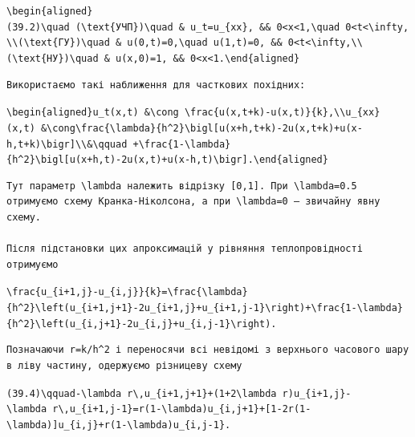 \documentclass[
  ukrainian,
]{article}
\begin{document}
\texttt{\textbackslash{}begin\{aligned\}(39.2)\textbackslash{}quad\ (\textbackslash{}text\{УЧП\})\textbackslash{}quad\ \&\ u\_t=u\_\{xx\},\ \&\&\ 0\textless{}x\textless{}1,\textbackslash{}quad\ 0\textless{}t\textless{}\textbackslash{}infty,\textbackslash{}\textbackslash{}(\textbackslash{}text\{ГУ\})\textbackslash{}quad\ \&\ u(0,t)=0,\textbackslash{}quad\ u(1,t)=0,\ \&\&\ 0\textless{}t\textless{}\textbackslash{}infty,\textbackslash{}\textbackslash{}(\textbackslash{}text\{НУ\})\textbackslash{}quad\ \&\ u(x,0)=1,\ \&\&\ 0\textless{}x\textless{}1.\textbackslash{}end\{aligned\}}

\begin{verbatim}
Використаємо такі наближення для часткових похідних:
\end{verbatim}

\texttt{\textbackslash{}begin\{aligned\}u\_t(x,t)\ \&\textbackslash{}cong\ \textbackslash{}frac\{u(x,t+k)-u(x,t)\}\{k\},\textbackslash{}\textbackslash{}u\_\{xx\}(x,t)\ \&\textbackslash{}cong\textbackslash{}frac\{\textbackslash{}lambda\}\{h\^{}2\}\textbackslash{}bigl{[}u(x+h,t+k)-2u(x,t+k)+u(x-h,t+k)\textbackslash{}bigr{]}\textbackslash{}\textbackslash{}\&\textbackslash{}qquad\ +\textbackslash{}frac\{1-\textbackslash{}lambda\}\{h\^{}2\}\textbackslash{}bigl{[}u(x+h,t)-2u(x,t)+u(x-h,t)\textbackslash{}bigr{]}.\textbackslash{}end\{aligned\}}

\begin{verbatim}
Тут параметр \lambda належить відрізку [0,1]. При \lambda=0.5 отримуємо схему Кранка-Ніколсона, а при \lambda=0 — звичайну явну схему.

Після підстановки цих апроксимацій у рівняння теплопровідності отримуємо
\end{verbatim}

\texttt{\textbackslash{}frac\{u\_\{i+1,j\}-u\_\{i,j\}\}\{k\}=\textbackslash{}frac\{\textbackslash{}lambda\}\{h\^{}2\}\textbackslash{}left(u\_\{i+1,j+1\}-2u\_\{i+1,j\}+u\_\{i+1,j-1\}\textbackslash{}right)+\textbackslash{}frac\{1-\textbackslash{}lambda\}\{h\^{}2\}\textbackslash{}left(u\_\{i,j+1\}-2u\_\{i,j\}+u\_\{i,j-1\}\textbackslash{}right).}

\begin{verbatim}
Позначаючи r=k/h^2 і переносячи всі невідомі з верхнього часового шару в ліву частину, одержуємо різницеву схему
\end{verbatim}

\texttt{(39.4)\textbackslash{}qquad-\textbackslash{}lambda\ r\textbackslash{},u\_\{i+1,j+1\}+(1+2\textbackslash{}lambda\ r)u\_\{i+1,j\}-\textbackslash{}lambda\ r\textbackslash{},u\_\{i+1,j-1\}=r(1-\textbackslash{}lambda)u\_\{i,j+1\}+{[}1-2r(1-\textbackslash{}lambda){]}u\_\{i,j\}+r(1-\textbackslash{}lambda)u\_\{i,j-1\}.}
\end{document}
